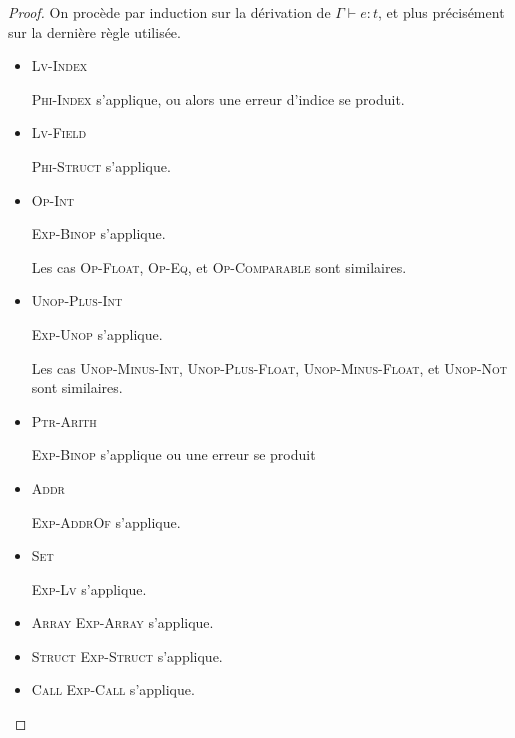 \begin{proof}
  On procède par induction sur la dérivation de $Γ ⊢ e : t$, et plus précisément
  sur la dernière règle utilisée.

\begin{itemize}

  \item \textsc{Lv-Index}

    \textsc{Phi-Index} s'applique, ou alors une erreur d'indice se produit.

  \item \textsc{Lv-Field}

    \textsc{Phi-Struct} s'applique.

  \item \textsc{Op-Int}

    \textsc{Exp-Binop} s'applique.

    Les cas \textsc{Op-Float}, \textsc{Op-Eq}, et \textsc{Op-Comparable} sont
    similaires.


  \item \textsc{Unop-Plus-Int}

    \textsc{Exp-Unop} s'applique.

    Les cas \textsc{Unop-Minus-Int}, \textsc{Unop-Plus-Float},
    \textsc{Unop-Minus-Float}, et \textsc{Unop-Not} sont similaires.

  \item \textsc{Ptr-Arith}

    \textsc{Exp-Binop} s'applique ou une erreur se produit

  \item \textsc{Addr}

    \textsc{Exp-AddrOf} s'applique.

  \item \textsc{Set}

    \textsc{Exp-Lv} s'applique.

  \item \textsc{Array}
    \textsc{Exp-Array} s'applique.

  \item \textsc{Struct}
    \textsc{Exp-Struct} s'applique.

  \item \textsc{Call}
    \textsc{Exp-Call} s'applique.

\end{itemize}

\end{proof}

